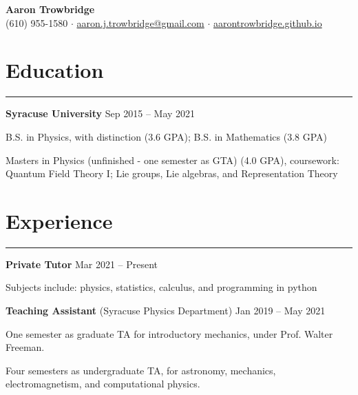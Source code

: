 \documentclass{article}
\newcommand{\myline}{\rule[\baselineskip]{\linewidth}{1pt}}
\begin{document}
\begin{center}
\huge
\textbf{Aaron Trowbridge}\\

\normalsize
(610) 955-1580 $\cdot$ \href{mailto:aaron.j.trowbridge@gmail.com}{aaron.j.trowbridge@gmail.com} $\cdot$ \href{https://aarontrowbridge.github.io/}{aarontrowbridge.github.io} \\

\end{center}


\section{Education}
\myline


\large\textbf{Syracuse University} \hfill \small Sep 2015 -- May 2021

\normalsize
\begin{compactitem}
\setlength\itemsep{0em}
\item B.S. in Physics, with distinction (3.6 GPA); B.S. in Mathematics (3.8 GPA) 
\item Masters in Physics (unfinished - one semester as GTA) (4.0 GPA), coursework: \\ Quantum Field Theory I; Lie groups, Lie algebras, and Representation Theory      
\end{compactitem}


\section{Experience}
\myline

\large\textbf{Private Tutor} \hfill \small Mar 2021 -- Present
\normalsize

\begin{compactitem}
\item Subjects include: physics, statistics, calculus, and programming in python
\end{compactitem}


\large\textbf{Teaching Assistant} \normalsize (Syracuse Physics Department)
 \hfill \small Jan 2019 -- May 2021
\normalsize

\begin{compactitem}
\item One semester as graduate TA for introductory mechanics, under Prof. Walter Freeman.
\item Four semesters as undergraduate TA, for astronomy, mechanics, electromagnetism, and computational physics.  
\end{compactitem}
\end{document}
